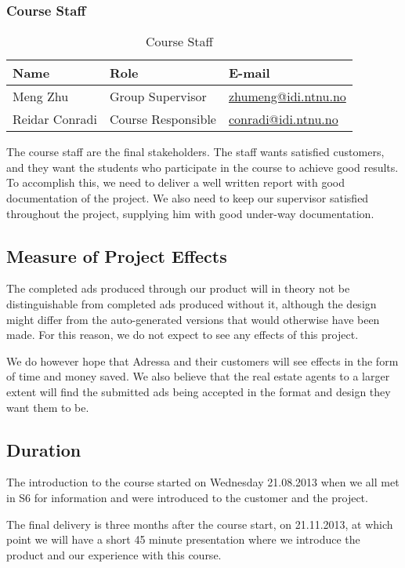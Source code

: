 \subsubsection{Course Staff}
\begin{table}[H]
\begin{tabular}{|p{4cm}|p{4cm}|p{5cm}|}
\hline
\textbf{Name} & \textbf{Role} & \textbf{E-mail} \\
\hline
Meng Zhu & Group Supervisor & \href{mailto://zhumeng@idi.ntnu.no}{zhumeng@idi.ntnu.no}\\
\hline
Reidar Conradi & Course Responsible & \href{mailto://conradi@idi.ntnu.no}{conradi@idi.ntnu.no}\\
\hline
\end{tabular}
\caption{Course Staff}
\end{table}

The course staff are the final stakeholders. The staff wants satisfied customers, and they want the students who participate in the course to achieve good results. To accomplish this, we need to deliver a well written report with good documentation of the project. We also need to keep our supervisor satisfied throughout the project, supplying him with good under-way documentation.

\subsection{Measure of Project Effects}
The completed ads produced through our product will in theory not be distinguishable from completed ads produced without it, although the design might differ from the auto-generated versions that would otherwise have been made. For this reason, we do not expect to see any effects of this project.

We do however hope that Adressa and their customers will see effects in the form of time and money saved. We also believe that the real estate agents to a larger extent will find the submitted ads being accepted in the format and design they want them to be.

\subsection{Duration}
The introduction to the course started on Wednesday 21.08.2013 when we all met in S6 for information and were introduced to the customer and the project.

The final delivery is three months after the course start, on 21.11.2013, at which point we will have a short 45 minute presentation where we introduce the product and our experience with this course.